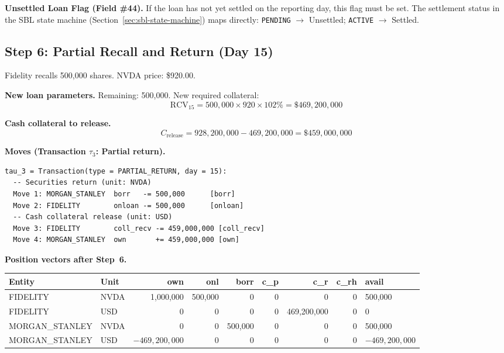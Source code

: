 \documentclass[11pt,a4paper]{article}
\begin{document}
\noindent\textbf{Unsettled Loan Flag (Field \#44).} If the loan has not yet settled on the reporting day, this flag must be set. The settlement status in the SBL state machine (Section~\ref{sec:sbl-state-machine}) maps directly: \texttt{PENDING} $\to$ Unsettled; \texttt{ACTIVE} $\to$ Settled.

\subsection{Step 6: Partial Recall and Return (Day 15)}
\label{sec:us-step6}

Fidelity recalls 500{,}000 shares. NVDA price: \$920.00.

\medskip
\noindent\textbf{New loan parameters.} Remaining: 500{,}000. New required collateral:
\[
\mathrm{RCV}_{15} = 500{,}000 \times 920 \times 102\% = \$469{,}200{,}000
\]

\noindent\textbf{Cash collateral to release.}
\[
C_{\mathrm{release}} = 928{,}200{,}000 - 469{,}200{,}000 = \$459{,}000{,}000
\]

\medskip
\noindent\textbf{Moves (Transaction $\tau_3$: Partial return).}

\begin{lstlisting}
tau_3 = Transaction(type = PARTIAL_RETURN, day = 15):
  -- Securities return (unit: NVDA)
  Move 1: MORGAN_STANLEY  borr   -= 500,000      [borr]
  Move 2: FIDELITY        onloan -= 500,000      [onloan]
  -- Cash collateral release (unit: USD)
  Move 3: FIDELITY        coll_recv -= 459,000,000 [coll_recv]
  Move 4: MORGAN_STANLEY  own       += 459,000,000 [own]
\end{lstlisting}

\medskip
\noindent\textbf{Position vectors after Step~6.}

\begin{center}\small
\begin{tabular}{l l r r r r r r l}
\toprule
\textbf{Entity} & \textbf{Unit} & own & onl & borr & c\_p & c\_r & c\_rh & avail \\
\midrule
FIDELITY & NVDA & 1{,}000{,}000 & 500{,}000 & 0 & 0 & 0 & 0 & 500{,}000 \\
FIDELITY & USD & 0 & 0 & 0 & 0 & 469{,}200{,}000 & 0 & 0 \\
\midrule
MORGAN\_STANLEY & NVDA & 0 & 0 & 500{,}000 & 0 & 0 & 0 & 500{,}000 \\
MORGAN\_STANLEY & USD & $-469{,}200{,}000$ & 0 & 0 & 0 & 0 & 0 & $-469{,}200{,}000$ \\
\bottomrule
\end{tabular}
\end{center}
\end{document}
